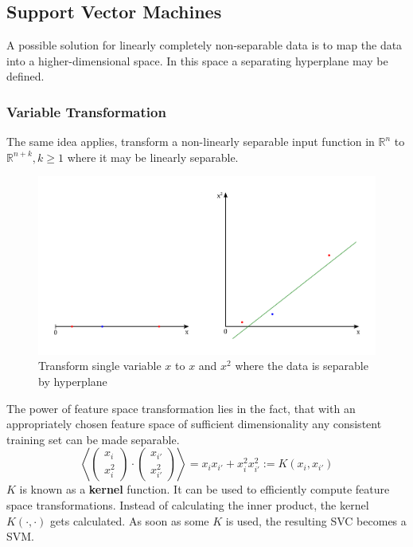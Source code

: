 \documentclass[11pt]{article}
\theoremstyle{definition}
\newcommand*\R{\mathbb{R}}
\begin{document}
\subsection{Support Vector Machines}
A possible solution for linearly completely non-separable data is to map the data into a higher-dimensional space. In this space a separating hyperplane may be defined. 

\subsubsection{Variable Transformation}
The same idea applies, transform a non-linearly separable input function in $\R^n$ to $\R^{n+k}, k\geq 1$ where it may be linearly separable.

\begin{figure}[H]
	\centering
	\includegraphics[keepaspectratio,width=0.6\linewidth]{variable_transformation.png}
	\caption{Transform single variable $x$ to $x$ and $x^2$ where the data is separable by hyperplane}
\end{figure}

The power of feature space transformation lies in the fact, that with an appropriately chosen feature space of sufficient dimensionality any consistent training set can be made separable.
\begin{equation*}
	\left\langle \begin{pmatrix}x_i\\x_i^2\end{pmatrix} \cdot\begin{pmatrix}x_{i'}\\x_{i'}^2\end{pmatrix} \right\rangle = x_i x_{i' } + x_i^2 x_{i' }^2 := K(x_i,x_{i'})
\end{equation*}
$K$ is known as a \textbf{kernel} function. It can be used to efficiently compute feature space transformations. Instead of calculating the inner product, the kernel $K(\cdot,\cdot)$ gets calculated. As soon as some $K$ is used, the resulting SVC becomes a SVM.
\end{document}
